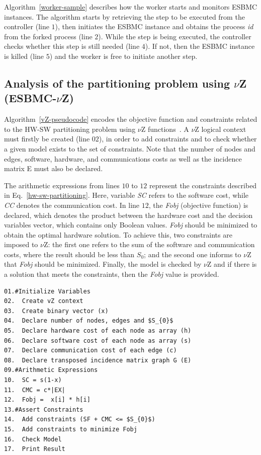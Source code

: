 Algorithm~\ref{worker-sample} describes how the worker starts and monitors ESBMC instances. The algorithm starts by retrieving the step to be executed from the controller (line $1$), then initiates the ESBMC instance and obtains the process \textit{id} from the forked process (line $2$). While the step is being executed, the controller checks whether this step is still needed (line $4$). If not, then the ESBMC instance is killed (line $5$) and the worker is free to initiate another step.

\subsection{Analysis of the partitioning problem using $\nu$Z (ESBMC-$\nu$Z)}
\label{Analysis-of-the-partitioning-problem-using-vZ}

Algorithm~\ref{vZ-pseudocode} encodes the objective function and constraints related to the HW-SW partitioning problem using $\nu$Z functions~\cite{Bjorner2014}. A $\nu$Z logical context must firstly be created (line $02$), in order to add constraints and to check whether a given model exists to the set of constraints. Note that the number of nodes and edges, software, hardware, and communications costs as well as the incidence matrix E must also be declared.

The arithmetic expressions from lines $10$ to $12$ represent the constraints described in Eq.~\ref{hw-sw-partitioning}. Here, variable \textit{SC} refers to the software cost, while \textit{CC} denotes the communication cost. In line $12$, the \textit{Fobj} (objective function) is declared, which denotes the product between the hardware cost and the decision variables vector, which contains only Boolean values. \textit{Fobj} should be minimized to obtain the optimal hardware solution. To achieve this, two constraints are imposed to $\nu$Z: the first one refers to the sum of the software and communication costs, where the result should be less than $S_0$; and the second one informs to $\nu$Z that \textit{Fobj} should be minimized. Finally, the model is checked by $\nu$Z and if there is a solution that meets the constraints, then the \textit{Fobj} value is provided.

\begin{lstlisting}[caption=Pseudocode describing $\nu$Z,label=vZ-pseudocode, mathescape]
01.#Initialize Variables
02.  Create vZ context 
03.  Create binary vector (x)
04.  Declare number of nodes, edges and $S_{0}$
05.  Declare hardware cost of each node as array (h) 
06.  Declare software cost of each node as array (s)
07.  Declare communication cost of each edge (c)
08.  Declare transposed incidence matrix graph G (E)
09.#Arithmetic Expressions
10.  SC = s(1-x)
11.  CMC = c*|EX|
12.  Fobj =  x[i] * h[i]
13.#Assert Constraints
14.  Add constraints (SF + CMC <= $S_{0}$)
15.  Add constraints to minimize Fobj
16.  Check Model
17.  Print Result
\end{lstlisting}


